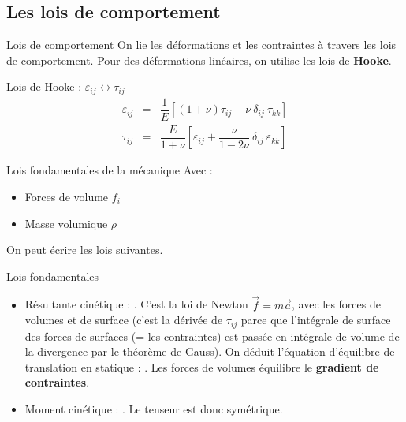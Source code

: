 \documentclass[10pt]{beamer}
\begin{document}
\subsection{Les lois de comportement}
\begin{frame}{Lois de comportement}
On lie les déformations et les contraintes à travers les lois de comportement. Pour des déformations linéaires, on utilise les lois de \textbf{Hooke}.
\begin{block}{Lois de Hooke : $\varepsilon_{ij} \leftrightarrow \tau_{ij}$}
\begin{eqnarray}
\varepsilon_{ij} &=& \dfrac{1}{E} \left[(1+\nu) \tau_{ij} - \nu\ \delta_{ij}\ \tau_{kk} \right] \\
\tau_{ij} &=& \dfrac{E}{1+\nu}\left[\varepsilon_{ij} + \dfrac{\nu}{1-2\nu}\ \delta_{ij}\ \varepsilon_{kk} \right]
\end{eqnarray}
\end{block}
\end{frame}
\begin{frame}{Lois fondamentales de la mécanique}
Avec :
\begin{itemize}
\item Forces de volume $f_i$
\item Masse volumique $\rho$
\end{itemize}
On peut écrire les lois suivantes.
\begin{block}{Lois fondamentales}
\begin{itemize}
\item Résultante cinétique : . C'est la loi de Newton $\vec{f} = m \vec{a}$, avec les forces de volumes et de surface (c'est la dérivée de $\tau_{ij}$ parce que l'intégrale de surface des forces de surfaces (= les contraintes) est passée en intégrale de volume de la divergence par le théorème de Gauss). On déduit l'équation d'équilibre de translation en statique : . Les forces de volumes équilibre le \textbf{gradient de contraintes}.
\item Moment cinétique : . Le tenseur est donc symétrique.
\end{itemize}
\end{block}
\end{frame}
\end{document}
